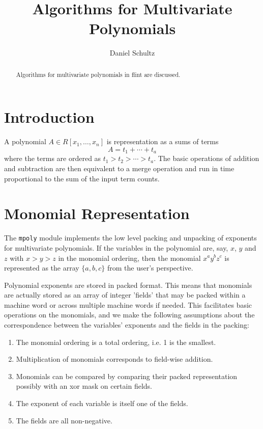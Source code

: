 \documentclass[12pt,reqno]{amsart}
\title{Algorithms for Multivariate Polynomials}
\author{Daniel Schultz}
\numberwithin{equation}{section}
\begin{document}
\begin{abstract}
Algorithms for multivariate polynomials in flint are discussed.
\end{abstract}


\maketitle

\section{Introduction}

A polynomial $A \in R[x_1,\dots,x_n]$ is representation as a sums of terms
\begin{equation*}
A = t_1 + \cdots + t_a
\end{equation*}
where the terms are ordered as $t_1 > t_2 > \cdots > t_a$. The basic operations of addition and subtraction are then equivalent to a merge operation and run in time proportional to the sum of the input term counts.

\section{Monomial Representation}

The {\tt mpoly} module implements the low level packing and unpacking of exponents
for multivariate polynomials. If the variables in the polynomial are, say,
$x$, $y$ and $z$ with $x > y > z$ in the monomial ordering, then the monomial
$x^a y^b z^c$ is represented as the array $\{a, b, c\}$ from the user's perspective.

Polynomial exponents are stored in packed format. This means that monomials are
actually stored as an array of integer 'fields' that may be packed within
a machine word or across multiple machine words if needed.
This facilitates basic operations on the monomials, and we make the following assumptions about
the correspondence between the variables' exponents and the
fields in the packing:

\begin{enumerate}
\item {The monomial ordering is a total ordering, i.e. 1 is the smallest.}
\item{Multiplication of monomials corresponds to field-wise addition.}
\item{Monomials can be compared by comparing their packed representation possibly with an xor mask on certain fields.}
\item{The exponent of each variable is itself one of the fields.}
\item{The fields are all non-negative.}
\end{enumerate}
\end{document}
